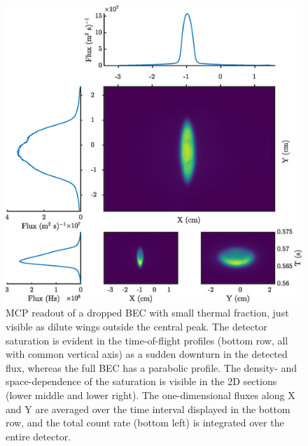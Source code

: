 
		 \newpage
	 \begin{figure}
	 	\centering
	 	\includegraphics[width=\textwidth]{fig/apparatus/dropped_bec}
	 	\caption{MCP readout of a dropped BEC with small thermal fraction, just visible as dilute wings outside the central peak.
		The detector saturation is evident in the time-of-flight profiles (bottom row, all with common vertical axis) as a sudden downturn in the detected flux, whereas the full BEC has a parabolic profile.
		The density- and space-dependence of the saturation is visible in the 2D sections (lower middle and lower right). The one-dimensional fluxes along X and Y are averaged over the time interval displayed in the bottom row, and the total count rate (bottom left) is integrated over the entire detector.}
	 	\label{fig:dropped_bec}
	 \end{figure}

